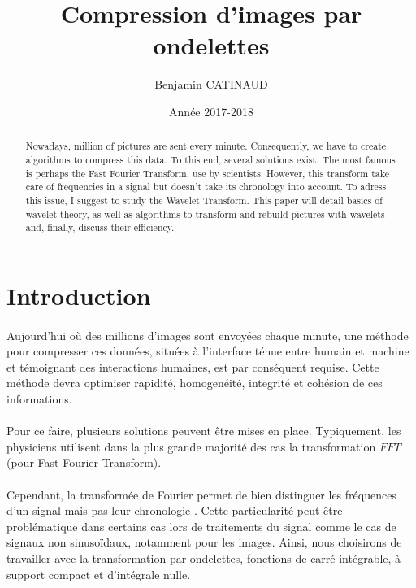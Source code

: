 \documentclass[a4paper,10pt]{report}
\title{Compression d'images par ondelettes}
\author{Benjamin CATINAUD}
\date{Ann\'{e}e 2017-2018}
\theoremstyle{break}
\begin{document}
\maketitle

\begin{abstract}
  Nowadays, million of pictures are sent every minute. Consequently, we have to create algorithms to compress this data.
  To this end, several solutions exist. The most famous is perhaps the Fast Fourier Transform, use by scientists. 
  However, this transform take care of frequencies in a signal but doesn't take its chronology into account. 
  To adress this issue, I suggest to study the Wavelet Transform. This paper will detail basics of wavelet theory, 
  as well as algorithms to transform and rebuild pictures with wavelets and, finally, discuss their efficiency.
\end{abstract}

\newpage

\section*{Introduction}

  \paragraph{} Aujourd'hui o\`{u} des millions d'images sont envoy\'{e}es chaque minute, une m\'{e}thode pour compresser ces donn\'{e}es,
    situ\'{e}es \`{a} l'interface t\'{e}nue entre humain et machine et t\'{e}moignant des interactions humaines, est par cons\'{e}quent requise. 
    Cette m\'{e}thode devra optimiser rapidit\'{e}, homogen\'{e}it\'{e}, integrit\'{e} et coh\'{e}sion de ces informations.
    
  \paragraph{} Pour ce faire, plusieurs solutions peuvent \^{e}tre mises en place. Typiquement, les physiciens utilisent dans la plus grande
    majorit\'{e} des cas la transformation $FFT$ (pour Fast Fourier Transform).
	
  \paragraph{} Cependant, la transform\'{e}e de Fourier permet de bien distinguer les fr\'{e}quences d'un signal mais pas leur chronologie \cite{twt}.
    Cette particularit\'{e} peut \^{e}tre probl\'{e}matique dans certains cas lors de traitements du signal comme le cas de signaux non 
    sinuso\"{i}daux, notamment pour les images. Ainsi, nous choisirons de travailler avec la transformation par ondelettes,
    fonctions de carr\'{e} int\'{e}grable, \`{a} support compact et d'int\'{e}grale nulle.
    
\end{document}
